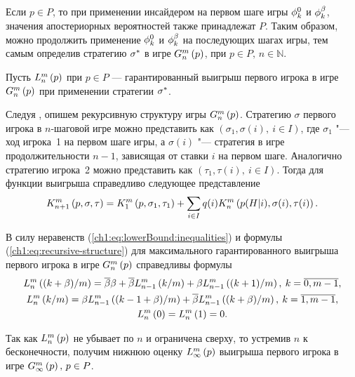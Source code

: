 {\begin{remark}
  \label{ch1:remark:posterior-probs}
  Если $p \in P$, то при применении инсайдером на первом шаге игры $\fEven$ и
  $\fOdd$, значения апостериорных вероятностей также принадлежат $P$. Таким
  образом, можно продолжить применение $\fEven$ и $\fOdd$ на последующих шагах
  игры, тем самым определив стратегию $\fOpt$ в игре $\generalGame{n}{p}$, при
  $p \in P, \, n \in \mathbb{N}$.
\end{remark}

Пусть $\lowerBound[n]{p}$ при $p \in P$ --- гарантированный выигрыш первого
игрока в игре $\generalGame{n}{p}$ при применении стратегии $\fOpt$.

Следуя \cite{domansky07}, опишем рекурсивную структуру игры
$\generalGame{n}{p}$. Стратегию $\sigma$ первого игрока в $n$-шаговой игре можно
представить как $(\sigma_1, \sigma(i),\ i \in I)$, где $\sigma_1$ "--- ход
игрока~1 на первом шаге игры, а $\sigma(i)$ "--- стратегия в игре
продолжительности $n-1$, зависящая от ставки $i$ на первом шаге. Аналогично
стратегию игрока~2 можно представить как $(\tau_1, \tau(i),\ i \in I)$. Тогда
для функции выигрыша справедливо следующее представление
\begin{equation}
  \label{ch1:eq:recursive-structure}
  \firstPlayerPayoff{n+1}{p}{\sigma}{\tau} = 
  \firstPlayerPayoff{1}{p}{\sigma_1}{\tau_1} + 
  \sum_{i \in I} q(i) \firstPlayerPayoff{n}{p(H|i)}{\sigma(i)}{\tau(i)}.
\end{equation}

В силу неравенств (\ref{ch1:eq:lowerBound:inequalities}) и формулы
(\ref{ch1:eq:recursive-structure}) для максимального гарантированного выигрыша
первого игрока в игре $\generalGame{n}{p}$ справедливы формулы
\begin{equation}
  \begin{gathered}
    \label{ch1:eq:lowerBound:recurrence:function}
    \lowerBound[n]{(k + \Co)/m} = \DCo\Co + \DCo\lowerBound[n-1]{k/m} +
    \Co\lowerBound[n-1]{(k + 1)/m}, \: k = \overline{0, m-1}, \\
    \lowerBound[n]{k/m} = \Co\lowerBound[n-1]{(k - 1 + \Co)/m} +
    \DCo\lowerBound[n-1]{(k + \Co)/m}, \: k = \overline{1, m-1}, \\
    \lowerBound[n]{0} = \lowerBound[n]{1} = 0.
  \end{gathered}
\end{equation}

Так как $\lowerBound[n]{p}$ не убывает по $n$ и ограничена сверху, то устремив
$n$ к бесконечности, получим нижнюю оценку $\lowerBound{p}$ выигрыша первого
игрока в игре $\infiniteGame{p}, \, p \in P$.

}
